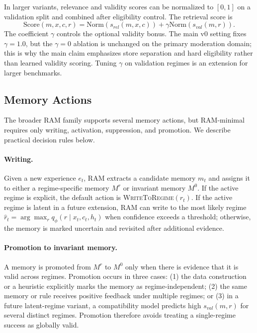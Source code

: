 \documentclass{article} %
\begin{document}
In larger variants, relevance and validity scores can be normalized to $[0,1]$ on a validation split and combined after eligibility control.
The retrieval score is
\begin{equation}
    \mathrm{Score}(m,x,c,r)
    =
    \mathrm{Norm}(s_{rel}(m,x,c))
    +
    \gamma \mathrm{Norm}(s_{val}(m,r)).
\end{equation}
The coefficient $\gamma$ controls the optional validity bonus.
The main v0 setting fixes $\gamma=1.0$, but the $\gamma=0$ ablation is unchanged on the primary moderation domain; this is why the main claim emphasizes store separation and hard eligibility rather than learned validity scoring.
Tuning $\gamma$ on validation regimes is an extension for larger benchmarks.

\subsection{Memory Actions}
\label{app:memory_actions}

The broader RAM family supports several memory actions, but RAM-minimal requires only writing, activation, suppression, and promotion.
We describe practical decision rules below.

\paragraph{Writing.}
Given a new experience $e_t$, RAM extracts a candidate memory $m_t$ and assigns it to either a regime-specific memory $M^r$ or invariant memory $M^0$.
If the active regime is explicit, the default action is \textsc{WriteToRegime}$(r_t)$.
If the active regime is latent in a future extension, RAM can write to the most likely regime $\hat r_t=\arg\max_r q_\phi(r \mid x_t,c_t,h_t)$ when confidence exceeds a threshold; otherwise, the memory is marked uncertain and revisited after additional evidence.

\paragraph{Promotion to invariant memory.}
A memory is promoted from $M^r$ to $M^0$ only when there is evidence that it is valid across regimes.
Promotion occurs in three cases:
(1) the data construction or a heuristic explicitly marks the memory as regime-independent;
(2) the same memory or rule receives positive feedback under multiple regimes;
or (3) in a future latent-regime variant, a compatibility model predicts high $s_{val}(m,r)$ for several distinct regimes.
Promotion therefore avoids treating a single-regime success as globally valid.
\end{document}

